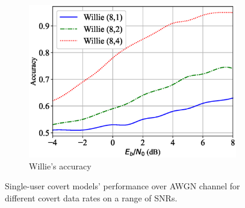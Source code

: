 \begin{figure}[tp!]
\begin{subfigure}{0.28\textwidth}
		\includegraphics[width=\linewidth]{figs/willie_accuracy_awgn}
		\caption{Willie's accuracy}	
		\label{fig:awgn_resutls_willie}
	\end{subfigure}
	\caption{Single-user covert models' performance over AWGN channel for different covert data rates on a range of SNRs.}
	\label{fig:awgn_results}
\end{figure}
